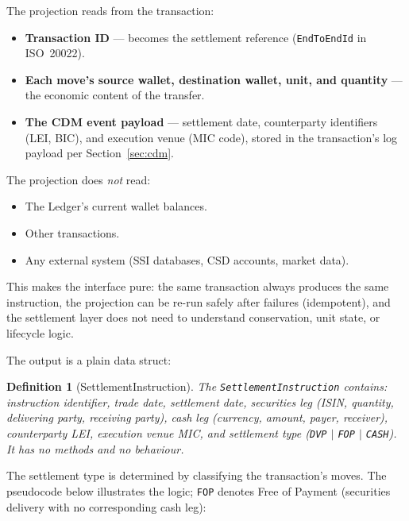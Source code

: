 \documentclass[11pt,a4paper]{article}
\newtheorem{definition}{Definition}[section]
\begin{document}
The projection reads from the transaction:
\begin{itemize}[nosep]
\item \textbf{Transaction ID} --- becomes the settlement reference (\texttt{EndToEndId} in ISO~20022).
\item \textbf{Each move's source wallet, destination wallet, unit, and quantity} --- the economic content of the transfer.
\item \textbf{The CDM event payload} --- settlement date, counterparty identifiers (LEI, BIC), and execution venue (MIC code), stored in the transaction's log payload per Section~\ref{sec:cdm}.
\end{itemize}

\noindent The projection does \emph{not} read:
\begin{itemize}[nosep]
\item The Ledger's current wallet balances.
\item Other transactions.
\item Any external system (SSI databases, CSD accounts, market data).
\end{itemize}

\noindent This makes the interface pure: the same transaction always produces the same instruction, the projection can be re-run safely after failures (idempotent), and the settlement layer does not need to understand conservation, unit state, or lifecycle logic.

The output is a plain data struct:

\begin{definition}[SettlementInstruction]
The \texttt{SettlementInstruction} contains: instruction identifier, trade date, settlement date, securities leg (ISIN, quantity, delivering party, receiving party), cash leg (currency, amount, payer, receiver), counterparty LEI, execution venue MIC, and settlement type (\texttt{DVP} $\mid$ \texttt{FOP} $\mid$ \texttt{CASH}). It has no methods and no behaviour.
\end{definition}

\noindent The settlement type is determined by classifying the transaction's moves. The pseudocode below illustrates the logic; \texttt{FOP} denotes Free of Payment (securities delivery with no corresponding cash leg):
\end{document}
